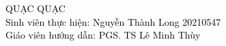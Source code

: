 \begin{frame}[noframenumbering]
    \thispagestyle{empty}
    \bfseries
    \begin{flushleft}
        \vfill
        \vspace{10mm}
        \hspace{-2mm} \textcolor{black}{\Large QUẠC QUẠC} \\[1.5em]
        \textcolor{black}{\large Sinh viên thực hiện: Nguyễn Thành Long 20210547} \\[0.5em]
        \textcolor{black}{\large Giáo viên hướng dẫn: PGS. TS Lê Minh Thùy}
        \vfill
    \end{flushleft}
\end{frame}